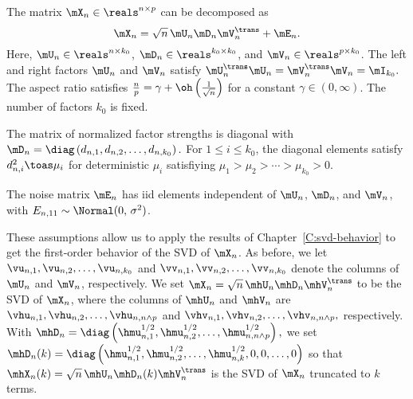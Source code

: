 \begin{assumption}
    The matrix $\mX_n \in \reals^{n \times p}$ can be decomposed as
    \begin{equation}
        \mX_n = \sqrt{n} \, \mU_n \mD_n \mV_n^\trans + \mE_n.
    \end{equation}
    Here, 
    $\mU_n \in \reals^{n \times k_0}$, $\mD_n \in \reals^{k_0 \times k_0}$,
    and $\mV_n \in \reals^{p \times k_0}$.  The left and right factors
    $\mU_n$ and $\mV_n$ satisfy
    \(
        \mU_n^\trans \mU_n = \mV_n^\trans \mV_n = \mI_{k_0}.
    \)
    The aspect ratio satisfies
    $\frac{n}{p} = \gamma + \oh\left( \frac{1}{\sqrt{n}}\right)$ for a
    constant $\gamma \in (0, \infty)$.  The number of factors $k_0$
    is fixed.
\end{assumption}

\begin{assumption}
    The matrix of normalized factor strengths is diagonal with
    \(
        \mD_n
            =
                \diag \left(
                    d_{n,1}, d_{n,2}, \ldots, d_{n,k_0}
                \right).
    \)
    For $1 \leq i \leq k_0$, the diagonal elements satisfy
    $d_{n,i}^2 \toas \mu_i$ for deterministic $\mu_i$ satisfiying
    \(
        \mu_1 > \mu_2 > \cdots > \mu_{k_0} > 0.
    \)
\end{assumption}

\begin{assumption}
    The noise matrix $\mE_n$ has iid elements independent of $\mU_n$, 
    $\mD_n$, and $\mV_n$, with $E_{n,11} \sim \Normal( 0, \, \sigma^2)$.
\end{assumption}

\noindent
These assumptions allow us to apply the results of 
Chapter~\ref{C:svd-behavior} to get the first-order behavior of the
SVD of $\mX_n$.  As before, we let $\vu_{n,1}, \vu_{n,2}, \ldots, \vu_{n,k_0}$
and $\vv_{n,1}, \vv_{n,2}, \ldots, \vv_{n,k_0}$ denote the columns of
$\mU_n$ and $\mV_n$, respectively.  We set 
$\mX_n = \sqrt{n} \, \mhU_n \mhD_n \mhV_n^\trans$ to be the SVD of $\mX_n$,
where the columns of $\mhU_n$ and $\mhV_n$ are
\(
    \vhu_{n,1}, \vhu_{n,2}, \ldots, \vhu_{n,n\wedge p}
\)
and
\(
    \vhv_{n,1}, \vhv_{n,2}, \ldots, \vhv_{n,n\wedge p},
\)
respectively.  With
\(
    \mhD_n 
        = 
            \diag \left(
                \hmu_{n,1}^{1/2}, 
                \hmu_{n,2}^{1/2}, 
                \ldots, 
                \hmu_{n,n\wedge p}^{1/2}
            \right),
\)
we set
\(
    \mhD_n(k)
        =
            \diag \left(
                \hmu_{n,1}^{1/2}, 
                \hmu_{n,2}^{1/2}, 
                \ldots, 
                \hmu_{n,k}^{1/2}, 
                0, 
                0,
                \ldots, 
                0
            \right)
\)
so that
\(
    \mhX_{n}(k) = \sqrt{n} \, \mhU_n \mhD_n(k) \mhV_n^\trans
\)
is the SVD of $\mX_n$ truncated to $k$ terms.

